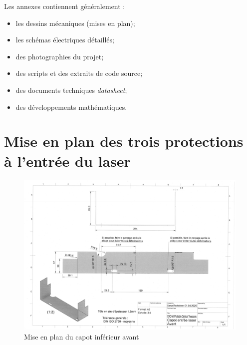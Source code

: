 Les annexes contiennent généralement :

\begin{itemize}
    \item les dessins mécaniques (mises en plan);
    \item les schémas électriques détaillés;
    \item des photographies du projet;
    \item des scripts et des extraits de code source;
    \item des documents techniques \pex \emph{datasheet};
    \item des développements mathématiques.
\end{itemize}

\section{Mise en plan des trois protections à l'entrée du laser}
\begin{figure}[H]
    \centering
    \includegraphics[angle=90,width=\textwidth]{assets/figures/Annexes/Mises_en_plan/mise_en_plan_avant.png}
    \caption{Mise en plan du capot inférieur avant}
    \label{mise_en_plan_capot_avant}
\end{figure}

